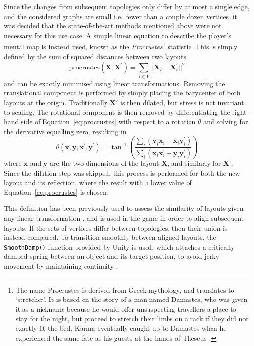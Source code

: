Since the changes from subsequent topologies only differ by at most a single edge, and the considered graphs are small i.e.\ fewer than a couple dozen vertices, it was decided that the state-of-the-art methods mentioned above were not necessary for this use case. A simple linear equation to describe the player's mental map is instead used, known as the \emph{Procrustes}\footnote{The name Procrustes is derived from Greek mythology, and translates to `stretcher'. It is based on the story of a man named Damastes, who was given it as a nickname because he would offer unsuspecting travellers a place to stay for the night, but proceed to stretch their limbs on a rack if they did not exactly fit the bed. Karma eventually caught up to Damastes when he experienced the same fate as his guests at the hands of Theseus \cite{Cox2000}.} statistic.
This is simply defined by the sum of squared distances between two layouts
\begin{equation}
  \mathrm{procrustes}(\mathbf{X}, \mathbf{X}^\prime) = \sum_{i\in V} ||\mathbf{X}_i - \mathbf{X}_i^\prime||^2
  \label{eq:procrustes}
\end{equation}
and can be exactly minimised using linear transformations. Removing the translational component is performed by simply placing the barycenter of both layouts at the origin. Traditionally $\mathbf{X}'$ is then dilated, but stress is not invariant to scaling. The rotational component is then removed by differentiating the right-hand side of Equation~\eqref{eq:procrustes} with respect to a rotation $\theta$ and solving for the derivative equalling zero, resulting in
\begin{equation}
  \theta(\mathbf{x},\mathbf{y}, \mathbf{x^\prime}, \mathbf{y^\prime}) = 
  \tan^{\text{--}1}\left(\frac{\sum_i(\mathbf{y}_i\mathbf{x}^\prime_i-\mathbf{x}_i\mathbf{y}^\prime_i)}{\sum_i(\mathbf{x}_i\mathbf{x}^\prime_i-\mathbf{y}_i\mathbf{y}^\prime_i)}\right)
\end{equation}
where $\mathbf{x}$ and $\mathbf{y}$ are the two dimensions of the layout $\mathbf{X}$, and similarly for $\mathbf{X}^\prime$. Since the dilation step was skipped, this process is performed for both the new layout and its reflection, where the result with a lower value of Equation~\eqref{eq:procrustes} is chosen.

This definition has been previously used to assess the similarity of layouts given any linear transformation \cite{Ortmann2017}, and is used in the game in order to align subsequent layouts. If the sets of vertices differ between topologies, then their union is instead compared.
To transition smoothly between aligned layouts, the \texttt{SmoothDamp()} function provided by Unity is used, which attaches a critically damped spring between an object and its target position, to avoid jerky movement by maintaining continuity \cite{Kirmse2004}.

